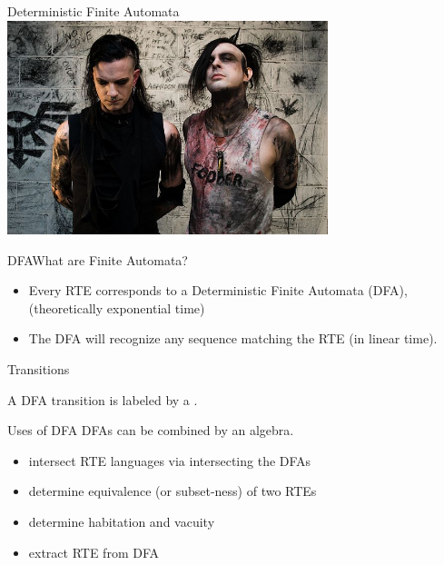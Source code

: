 


\begin{frame}{Deterministic Finite Automata}
  \centering
  \includegraphics[width=0.7\textwidth]{fa-band.jpg}
\end{frame}


\begin{frame}{DFA}{What are Finite Automata?}
  \begin{itemize}
  \item   Every RTE corresponds to a Deterministic Finite Automata (DFA),  (theoretically exponential time)

  \item   The DFA will recognize any sequence matching the RTE (in linear time).

  \end{itemize}
\end{frame}

\begin{frame}{ Transitions}

  \scalebox{0.7}{}

  A DFA transition is labeled by a .
\end{frame}



\begin{frame}{Uses of DFA}
  DFAs can be combined by an algebra.

  \begin{itemize}
  \item intersect RTE languages via intersecting the DFAs
  \item determine equivalence (or subset-ness) of two RTEs
  \item determine habitation and vacuity
  \item extract RTE from DFA
  \end{itemize}
\end{frame}



